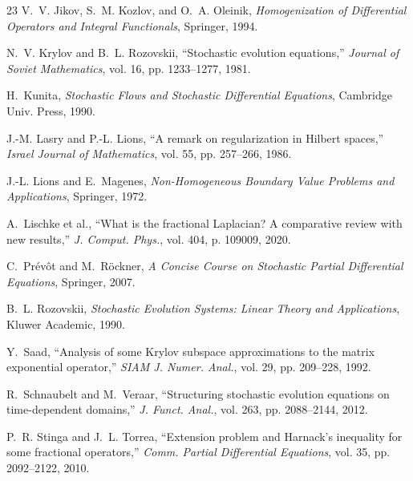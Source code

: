 \documentclass[11pt,a4paper]{article}
\theoremstyle{plain}
\theoremstyle{definition}
\theoremstyle{remark}
\begin{document}
\begin{thebibliography}{23}
V.~V. Jikov, S.~M. Kozlov, and O.~A. Oleinik, \emph{Homogenization of Differential Operators and Integral Functionals}, Springer, 1994.

N.~V. Krylov and B.~L. Rozovskii, ``Stochastic evolution equations,'' \emph{Journal of Soviet Mathematics}, vol. 16, pp. 1233--1277, 1981.

H.~Kunita, \emph{Stochastic Flows and Stochastic Differential Equations}, Cambridge Univ. Press, 1990.

J.-M. Lasry and P.-L. Lions, ``A remark on regularization in Hilbert spaces,'' \emph{Israel Journal of Mathematics}, vol. 55, pp. 257--266, 1986.

J.-L. Lions and E.~Magenes, \emph{Non-Homogeneous Boundary Value Problems and Applications}, Springer, 1972.

A.~Lischke et al., ``What is the fractional Laplacian? A comparative review with new results,'' \emph{J. Comput. Phys.}, vol. 404, p. 109009, 2020.

C.~Pr\'{e}v\^{o}t and M.~R\"{o}ckner, \emph{A Concise Course on Stochastic Partial Differential Equations}, Springer, 2007.

B.~L. Rozovskii, \emph{Stochastic Evolution Systems: Linear Theory and Applications}, Kluwer Academic, 1990.

Y.~Saad, ``Analysis of some Krylov subspace approximations to the matrix exponential operator,'' \emph{SIAM J. Numer. Anal.}, vol. 29, pp. 209--228, 1992.

R.~Schnaubelt and M.~Veraar, ``Structuring stochastic evolution equations on time-dependent domains,'' \emph{J. Funct. Anal.}, vol. 263, pp. 2088--2144, 2012.

P.~R. Stinga and J.~L. Torrea, ``Extension problem and Harnack's inequality for some fractional operators,'' \emph{Comm. Partial Differential Equations}, vol. 35, pp. 2092--2122, 2010.

\end{thebibliography}
\end{document}
